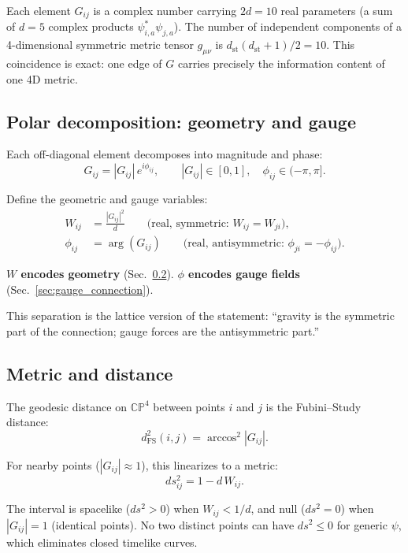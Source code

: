 \documentclass[12pt]{article}
\theoremstyle{remark}
\theoremstyle{definition}
\begin{document}
Each element $G_{ij}$ is a complex number carrying $2d = 10$ real parameters (a sum of $d = 5$ complex products $\psi^*_{i,a}\psi_{j,a}$). The number of independent components of a 4-dimensional symmetric metric tensor $g_{\mu\nu}$ is $d_\text{st}(d_\text{st}+1)/2 = 10$. This coincidence is exact: one edge of $G$ carries precisely the information content of one 4D metric.

\subsection{Polar decomposition: geometry and gauge}

Each off-diagonal element decomposes into magnitude and phase:
\begin{equation}
G_{ij} = |G_{ij}|\,e^{i\phi_{ij}}, \qquad |G_{ij}| \in [0, 1], \quad \phi_{ij} \in (-\pi, \pi].
\end{equation}

Define the geometric and gauge variables:
\begin{align}
W_{ij} &= \frac{|G_{ij}|^2}{d} \qquad\text{(real, symmetric: } W_{ij} = W_{ji}\text{)}, \label{eq:W}\\
\phi_{ij} &= \arg(G_{ij}) \qquad\text{(real, antisymmetric: } \phi_{ji} = -\phi_{ij}\text{)}. \label{eq:phi}
\end{align}

\textbf{$W$ encodes geometry} (Sec.~\ref{sec:metric}). \textbf{$\phi$ encodes gauge fields} (Sec.~\ref{sec:gauge_connection}).

This separation is the lattice version of the statement: ``gravity is the symmetric part of the connection; gauge forces are the antisymmetric part.''

\subsection{Metric and distance}
\label{sec:metric}

The geodesic distance on $\mathbb{CP}^4$ between points $i$ and $j$ is the Fubini--Study distance:
\begin{equation}
d^2_\text{FS}(i, j) = \arccos^2|G_{ij}|.
\end{equation}

For nearby points ($|G_{ij}| \approx 1$), this linearizes to a metric:
\begin{equation}
ds^2_{ij} = 1 - d\,W_{ij}.
\end{equation}

The interval is spacelike ($ds^2 > 0$) when $W_{ij} < 1/d$, and null ($ds^2 = 0$) when $|G_{ij}| = 1$ (identical points). No two distinct points can have $ds^2 \leq 0$ for generic $\psi$, which eliminates closed timelike curves.
\end{document}
